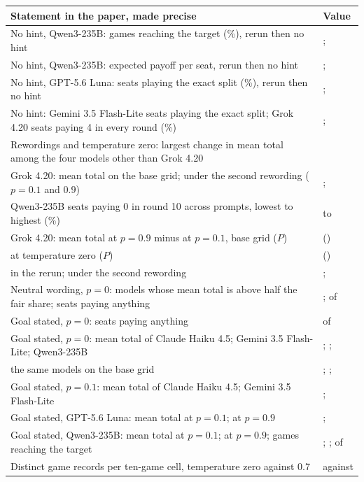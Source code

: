 \documentclass[10pt]{article}
\makeatletter
\newenvironment{claims}{\small\begin{tabular}{@{}>{\raggedright\arraybackslash}p{0.74\textwidth}>{\raggedleft\arraybackslash}p{0.2\textwidth}@{}}\toprule Statement in the paper, made precise & Value \\\midrule}{\bottomrule\end{tabular}}
\makeatother
\begin{document}
\begin{center}
\begin{claims}
No hint, Qwen3-235B: games reaching the target (\%), rerun then no hint & \NoCueQwenReachBase{}; \NoCueQwenReach{} \\
No hint, Qwen3-235B: expected payoff per seat, rerun then no hint & \NoCueQwenPayBase{}; \NoCueQwenPay{} \\
No hint, GPT-5.6 Luna: seats playing the exact split (\%), rerun then no hint & \NoCueLunaExactBasePct{}; \NoCueLunaExactPct{} \\
No hint: Gemini 3.5 Flash-Lite seats playing the exact split; Grok 4.20 seats paying 4 in every round (\%) & \NoCueFlashExactPct{}; \NoCueGrokAllFourPct{} \\
Rewordings and temperature zero: largest change in mean total among the four models other than Grok 4.20 & \RobFlatMaxShift{} \\
Grok 4.20: mean total on the base grid; under the second rewording ($p=0.1$ and $0.9$) & \RobGrokBase{}; \RobGrokParaTwo{} \\
Qwen3-235B seats paying 0 in round 10 across prompts, lowest to highest (\%) & \RobQwenLastZeroNoHint{} to \RobQwenLastZeroParaTwo{} \\
Grok 4.20: mean total at $p=0.9$ minus at $p=0.1$, base grid ($P$) & \RobGrokRiskBase{} (\SupGrokStepBaseP) \\
\quad at temperature zero ($P$) & \SupGrokStepTempZero{} (\SupGrokStepTempZeroP) \\
\quad in the rerun; under the second rewording & \RobGrokRiskRerun{}; \RobGrokRiskParaTwo{} \\
Neutral wording, $p=0$: models whose mean total is above half the fair share; seats paying anything & \WorZeroModelsPaying{}; \WorZeroPaying{} of \WorZeroSeats{} \\
Goal stated, $p=0$: seats paying anything & \NeuZeroPaying{} of \NeuZeroSeats{} \\
Goal stated, $p=0$: mean total of Claude Haiku 4.5; Gemini 3.5 Flash-Lite; Qwen3-235B & \NeuZeroHaiku{}; \NeuZeroFlashLite{}; \NeuZeroQwen{} \\
\quad the same models on the base grid & \GridZeroHaiku{}; \GridZeroFlashLite{}; \GridZeroQwen{} \\
Goal stated, $p=0.1$: mean total of Claude Haiku 4.5; Gemini 3.5 Flash-Lite & \NeuLowHaiku{}; \NeuLowFlashLite{} \\
Goal stated, GPT-5.6 Luna: mean total at $p=0.1$; at $p=0.9$ & \NeuLowLuna{}; \NeuHighLuna{} \\
Goal stated, Qwen3-235B: mean total at $p=0.1$; at $p=0.9$; games reaching the target & \NeuLowQwen{}; \NeuHighQwen{}; \NeuReachQwen{} of \NeuGamesQwen{} \\
Distinct game records per ten-game cell, temperature zero against 0.7 & \RobTempZeroDistinct{} against \RobTempZeroBaseDistinct{} \\
\end{claims}
\end{center}
\end{document}
